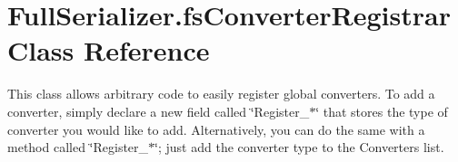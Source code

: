 \hypertarget{class_full_serializer_1_1fs_converter_registrar}{}\section{Full\+Serializer.\+fs\+Converter\+Registrar Class Reference}
\label{class_full_serializer_1_1fs_converter_registrar}


This class allows arbitrary code to easily register global converters. To add a converter, simply declare a new field called \char`\"{}\+Register\+\_\+$\ast$\char`\"{} that stores the type of converter you would like to add. Alternatively, you can do the same with a method called \char`\"{}\+Register\+\_\+$\ast$\char`\"{}; just add the converter type to the {\ttfamily Converters} list.  


